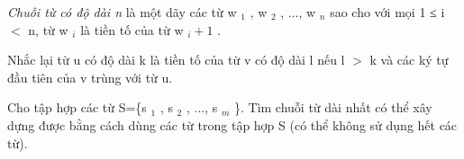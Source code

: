 \textit{    Chuỗi từ có độ dài n   }   là một dãy các từ w   $_    1   $   , w   $_    2   $   , ..., w   $_    n   $   sao cho với mọi 1 ≤ i $<$ n, từ w   $_    i   $   là tiền tố của từ w   $_    i+1   $   .  

   Nhắc lại từ u có độ dài k là tiền tố của từ v có độ dài l nếu l $>$ k và các ký tự đầu tiên của v trùng với từ u.  

   Cho tập hợp các từ S=\{s   $_    1   $   , s   $_    2   $   , ..., s   $_    m   $   \}. Tìm chuỗi từ dài nhất có thể xây dựng  được bằng cách dùng các từ trong tập hợp S (có thể không sử dụng hết các từ).